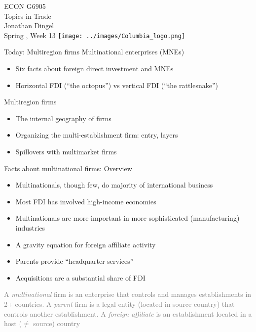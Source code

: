 \documentclass[11pt,notes=hide,aspectratio=169]{beamer}
\begin{document}
\setcounter{framenumber}{0}
\begin{frame}[plain]
\begin{center}
\large
\textcolor{columbiadarkblue}{ECON G6905\\
Topics in Trade\\ 
Jonathan Dingel\\
Spring \the\year, Week 13}
\vfill 
\texttt{[image: ../images/Columbia\_logo.png]}
\end{center}
\end{frame}
\begin{frame}{Today: Multiregion firms}
Multinational enterprises (MNEs)
\begin{itemize}
\item Six facts about foreign direct investment and MNEs
\item Horizontal FDI (``the octopus'') vs vertical FDI (``the rattlesnake'')
\end{itemize}
Multiregion firms
\begin{itemize}
\item The internal geography of firms
\item Organizing the multi-establishment firm: entry, layers
\item Spillovers with multimarket firms
\end{itemize}
\end{frame}
\begin{frame}{Facts about multinational firms: Overview}
\begin{itemize}
\item Multinationals, though few, do majority of international business
\item Most FDI has involved high-income economies
\item Multinationals are more important in more sophisticated (manufacturing) industries
\item A gravity equation for foreign affiliate activity
\item Parents provide ``headquarter services''
\item Acquisitions are a substantial share of FDI
\end{itemize}
\textcolor{gray}{
A \textit{multinational} firm is an enterprise that controls and manages establishments in 2+ countries.
A \textit{parent} firm is a legal entity (located in source country) that controls another establishment.
A \textit{foreign affiliate} is an establishment located in a host ($\neq$ source) country
}
\end{frame}
\end{document}
